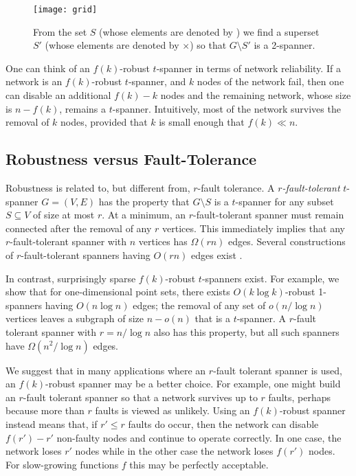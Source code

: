 \documentclass{patmorin}
\begin{document}
\begin{figure}
  \begin{center}
    \texttt{[image: grid]}
  \end{center}
  \caption{From the set $S$ (whose elements are denoted by \textbullet)
  we find a superset $S'$ (whose elements are denoted by $\times$)
  so that $G\setminus S'$ is a 2-spanner.}
\end{figure}

One can think of an $f(k)$-robust $t$-spanner in terms of network
reliability.  If a network is an $f(k)$-robust $t$-spanner, and $k$ nodes
of the network fail, then one can disable an additional $f(k)-k$ nodes
and the remaining network, whose size is $n-f(k)$, remains a $t$-spanner.
Intuitively, most of the network survives the removal of $k$ nodes,
provided that $k$ is small enough that $f(k)\ll n$.

\subsection{Robustness versus Fault-Tolerance}

Robustness is related to, but different from, $r$-fault tolerance.
A \emph{$r$-fault-tolerant} $t$-spanner $G=(V,E)$ has the property that
$G\setminus S$ is a $t$-spanner for any subset $S\subseteq V$ of size
at most $r$. At a minimum, an $r$-fault-tolerant spanner must remain
connected after the removal of any $r$ vertices.  This immediately implies
that any $r$-fault-tolerant spanner with $n$ vertices has $\Omega(rn)$
edges.  Several constructions of $r$-fault-tolerant spanners having
$O(rn)$ edges exist \cite{cz04,lns02,l99}.

In contrast, surprisingly sparse $f(k)$-robust $t$-spanners exist.
For example, we show that for one-dimensional point sets, there exists
$O(k\log k)$-robust 1-spanners having $O(n\log n)$ edges; the removal of
any set of $o(n/\log n)$ vertices leaves a subgraph of size $n-o(n)$ that
is a $t$-spanner.  A $r$-fault tolerant spanner with $r=n/\log n$ also
has this property, but all such spanners have $\Omega(n^2/\log n)$ edges.

We suggest that in many applications where an $r$-fault tolerant spanner
is used, an $f(k)$-robust spanner may be a better choice.  For example,
one might build an $r$-fault tolerant spanner so that a network survives
up to $r$ faults, perhaps because more than $r$ faults is viewed as
unlikely.  Using an $f(k)$-robust spanner instead means that, if $r'\le
r$ faults do occur, then the network can disable $f(r')-r'$ non-faulty
nodes and continue to operate correctly.  In one case, the network loses
$r'$ nodes while in the other case the network loses $f(r')$ nodes.
For slow-growing functions $f$ this may be perfectly acceptable.
\end{document}
